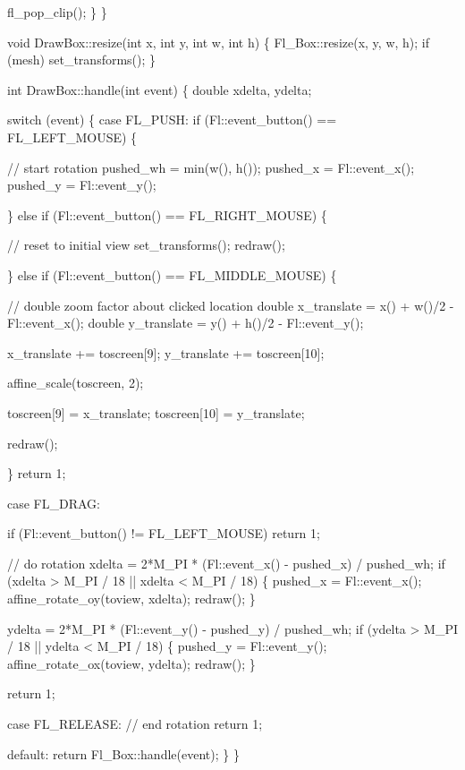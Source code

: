         fl_pop_clip();
    \}
\}

void DrawBox::resize(int x, int y, int w, int h)
\{
    Fl_Box::resize(x, y, w, h);
    if (mesh)
        set_transforms();
\}

int DrawBox::handle(int event)
\{
    double xdelta, ydelta;

    switch (event) \{
    case FL_PUSH:
        if (Fl::event_button() == FL_LEFT_MOUSE) \{

            // start rotation
            pushed_wh = min(w(), h());
            pushed_x  = Fl::event_x();
            pushed_y  = Fl::event_y();

        \} else if (Fl::event_button() == FL_RIGHT_MOUSE) \{

            // reset to initial view
            set_transforms();
            redraw();

        \} else if (Fl::event_button() == FL_MIDDLE_MOUSE) \{

            // double zoom factor about clicked location
            double x_translate = x() + w()/2 - Fl::event_x();
            double y_translate = y() + h()/2 - Fl::event_y();

            x_translate += toscreen[9];
            y_translate += toscreen[10];

            affine_scale(toscreen, 2);

            toscreen[9]  = x_translate;
            toscreen[10] = y_translate;

            redraw();

        \}
        return 1;

    case FL_DRAG:

        if (Fl::event_button() != FL_LEFT_MOUSE)
            return 1;

        // do rotation
        xdelta = 2*M_PI * (Fl::event_x() - pushed_x) / pushed_wh;
        if (xdelta > M_PI / 18 || xdelta < M_PI / 18) \{
            pushed_x = Fl::event_x();
            affine_rotate_oy(toview, xdelta);
            redraw();
        \}

        ydelta = 2*M_PI * (Fl::event_y() - pushed_y) / pushed_wh;
        if (ydelta > M_PI / 18 || ydelta < M_PI / 18) \{
            pushed_y = Fl::event_y();
            affine_rotate_ox(toview, ydelta);
            redraw();
        \}

        return 1;

    case FL_RELEASE:
        // end rotation
        return 1;

    default:
        return Fl_Box::handle(event);
    \}
\}


